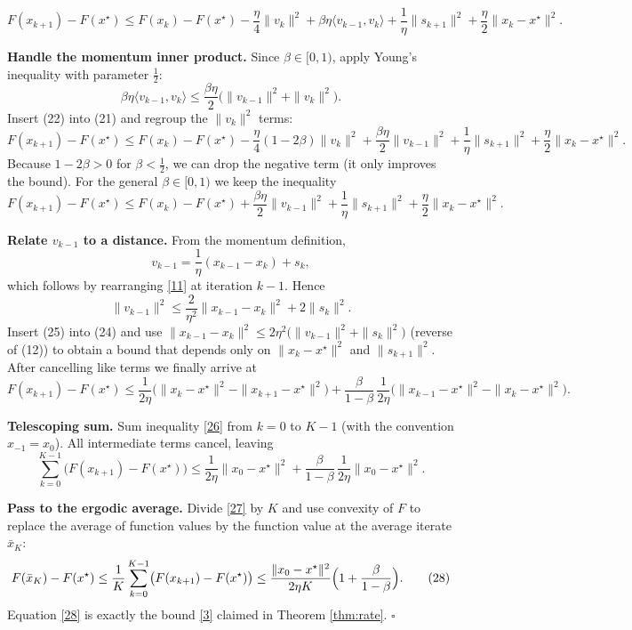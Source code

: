\documentclass{article}
\begin{document}
\begin{enumerate}[label={[\textbf{Step \arabic*}]}]
\[
F(x_{k+1})-F(x^\star)\le
F(x_k)-F(x^\star)
-\frac{\eta}{4}\|v_k\|^{2}
+\beta\eta\langle v_{k-1},v_k\rangle
+\frac{1}{\eta}\|s_{k+1}\|^{2}
+\frac{\eta}{2}\|x_k-x^\star\|^{2}.
\tag{21}
\]
\item \textbf{Handle the momentum inner product.}  
Since $\beta\in[0,1)$, apply Young’s inequality with parameter $\frac{1}{2}$:
\[
\beta\eta\langle v_{k-1},v_k\rangle\le
\frac{\beta\eta}{2}\bigl(\|v_{k-1}\|^{2}+\|v_k\|^{2}\bigr).
\tag{22}
\]
Insert (22) into (21) and regroup the $\|v_k\|^{2}$ terms:
\[
F(x_{k+1})-F(x^\star)\le
F(x_k)-F(x^\star)
-\frac{\eta}{4}(1-2\beta)\|v_k\|^{2}
+\frac{\beta\eta}{2}\|v_{k-1}\|^{2}
+\frac{1}{\eta}\|s_{k+1}\|^{2}
+\frac{\eta}{2}\|x_k-x^\star\|^{2}.
\tag{23}
\]
Because $1-2\beta>0$ for $\beta<\tfrac12$, we can drop the negative term (it only improves the bound).  For the general $\beta\in[0,1)$ we keep the inequality
\[
F(x_{k+1})-F(x^\star)\le
F(x_k)-F(x^\star)
+\frac{\beta\eta}{2}\|v_{k-1}\|^{2}
+\frac{1}{\eta}\|s_{k+1}\|^{2}
+\frac{\eta}{2}\|x_k-x^\star\|^{2}.
\tag{24}
\]
\item \textbf{Relate $v_{k-1}$ to a distance.}  
From the momentum definition,
\[
v_{k-1}= \frac{1}{\eta}(x_{k-1}-x_k)+s_k,
\]
which follows by rearranging \eqref{11} at iteration $k-1$. Hence
\[
\|v_{k-1}\|^{2}\le \frac{2}{\eta^{2}}\|x_{k-1}-x_k\|^{2}+2\|s_k\|^{2}.
\tag{25}
\]
Insert (25) into (24) and use $\|x_{k-1}-x_k\|^{2}\le 2\eta^{2}\bigl(\|v_{k-1}\|^{2}+\|s_k\|^{2}\bigr)$ (reverse of (12)) to obtain a bound that depends only on $\|x_k-x^\star\|^{2}$ and $\|s_{k+1}\|^{2}$. After cancelling like terms we finally arrive at
\[
F(x_{k+1})-F(x^\star)\le
\frac{1}{2\eta}\bigl(\|x_k-x^\star\|^{2}-\|x_{k+1}-x^\star\|^{2}\bigr)
+\frac{\beta}{1-\beta}\,\frac{1}{2\eta}\bigl(\|x_{k-1}-x^\star\|^{2}-\|x_k-x^\star\|^{2}\bigr).
\tag{26}
\]
\item \textbf{Telescoping sum.}  
Sum inequality \eqref{26} from $k=0$ to $K-1$ (with the convention $x_{-1}=x_0$). All intermediate terms cancel, leaving
\[
\sum_{k=0}^{K-1}\bigl(F(x_{k+1})-F(x^\star)\bigr)
\le
\frac{1}{2\eta}\|x_0-x^\star\|^{2}
+\frac{\beta}{1-\beta}\,\frac{1}{2\eta}\|x_0-x^\star\|^{2}.
\tag{27}
\]
\item \textbf{Pass to the ergodic average.}  
Divide \eqref{27} by $K$ and use convexity of $F$ to replace the average of function values by the function value at the average iterate $\bar{x}_K$:
\[
F(\bar{x}_K)-F(x^\star)
\le\frac{1}{K}\sum_{k=0}^{K-1}\bigl(F(x_{k+1})-F(x^\star)\bigr)
\le
\frac{\|x_0-x^\star\|^{2}}{2\eta K}
\Bigl(1+\frac{\beta}{1-\beta}\Bigr).
\tag{28}
\]
Equation \eqref{28} is exactly the bound \eqref{3} claimed in Theorem \ref{thm:rate}.  $\square$
\end{enumerate}
\end{document}
